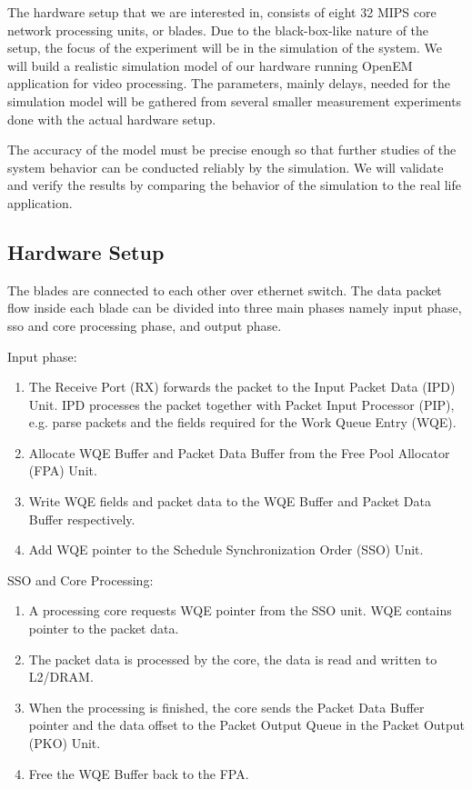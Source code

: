 The hardware setup that we are interested in, consists of eight 32 MIPS core network processing units, or blades. Due to the black-box-like nature of the setup, the focus of the experiment will be in the simulation of the system. We will build a realistic simulation model of our hardware running OpenEM application for video processing. The parameters, mainly delays, needed for the simulation model will be gathered from several smaller measurement experiments done with the actual hardware setup.

The accuracy of the model must be precise enough so that further studies of the system behavior can be conducted reliably by the simulation. We will validate and verify the results by comparing the behavior of the simulation to the real life application.

\subsection{Hardware Setup}
The blades are connected to each other over ethernet switch. The data packet flow inside each blade can be divided into three main phases namely input phase, sso and core processing phase, and output phase.

Input phase:
\begin{enumerate}
\item The Receive Port (RX) forwards the packet to the Input Packet Data (IPD) Unit. IPD processes the packet together with Packet Input Processor (PIP), e.g. parse packets and the fields required for the Work Queue Entry (WQE).
\item Allocate WQE Buffer and Packet Data Buffer from the Free Pool Allocator (FPA) Unit.
\item Write WQE fields and packet data to the WQE Buffer and Packet Data Buffer respectively.
\item Add WQE pointer to the Schedule Synchronization Order (SSO) Unit.
\end{enumerate}

SSO and Core Processing:
\begin{enumerate}
\item A processing core requests WQE pointer from the SSO unit. WQE contains pointer to the packet data.
\item The packet data is processed by the core, the data is read and written to L2/DRAM.
\item When the processing is finished, the core sends the Packet Data Buffer pointer and the data offset to the Packet Output Queue in the Packet Output (PKO) Unit.
\item Free the WQE Buffer back to the FPA.
\end{enumerate}

